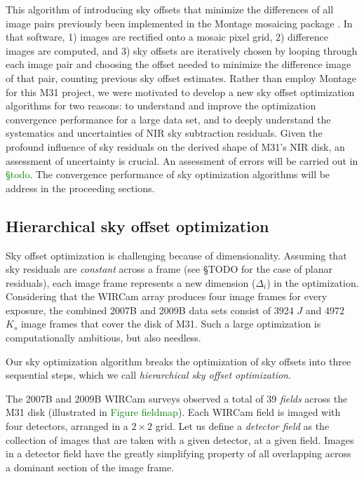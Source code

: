 \documentclass[iop]{emulateapj}
\newcommand{\todo}[1]{\textcolor{green}{#1}}
\begin{document}
This algorithm of introducing sky offsets that minimize the differences of all image pairs previously been implemented in the Montage mosaicing package \citep{Berriman:2008}. In that software, 1) images are rectified onto a mosaic pixel grid, 2) difference images are computed, and 3) sky offsets are iteratively chosen by looping through each image pair and choosing the offset needed to minimize the difference image of that pair, counting previous sky offset estimates. Rather than employ Montage for this M31 project, we were motivated to develop a new sky offset optimization algorithms for two reasons: to understand and improve the optimization convergence performance for a large data set, and to deeply understand the systematics and uncertainties of NIR sky subtraction residuals. Given the profound influence of sky residuals on the derived shape of M31's NIR disk, an assessment of uncertainty is crucial. An assessment of errors will be carried out in \todo{\S todo}. The convergence performance of sky optimization algorithms will be address in the proceeding sections.

\subsection{Hierarchical sky offset optimization}

Sky offset optimization is challenging because of dimensionality. Assuming that sky residuals are \emph{constant} across a frame (see \S TODO for the case of planar residuals), each image frame represents a new dimension ($\Delta_i$) in the optimization. Considering that the WIRCam array produces four image frames for every exposure, the combined 2007B and 2009B data sets consist of 3924 $J$ and 4972 $K_s$ image frames that cover the disk of M31. Such a large optimization is computationally ambitious, but also needless.

Our sky optimization algorithm breaks the optimization of sky offsets into three sequential steps, which we call \emph{hierarchical sky offset optimization}.

The 2007B and 2009B WIRCam surveys observed a total of 39 \emph{fields} across the M31 disk (illustrated in \todo{Figure fieldmap}). Each WIRCam field is imaged with four detectors, arranged in a $2\times 2$ grid. Let us define a \emph{detector field} as the collection of images that are taken with a given detector, at a given field. Images in a detector field have the greatly simplifying property of all overlapping across a dominant section of the image frame.
\end{document}
